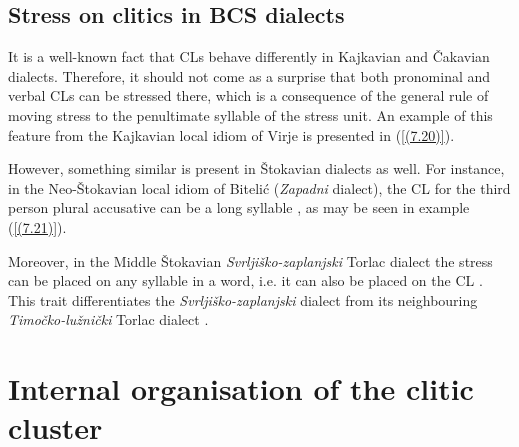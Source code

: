 \subsection{Stress on clitics in BCS dialects}

It is a well-known fact that CLs behave differently in Kajkavian and Čakavian dialects. Therefore, it should not come as a surprise that both pronominal and verbal CLs can be stressed there, which is a consequence of the general rule of moving stress to the penultimate syllable of the stress unit. An example of this feature from the Kajkavian local idiom of Virje is presented in (\ref{(7.20)}).


\noindent However, something similar is present in Štokavian dialects as well. For instance, in the Neo-Štokavian local idiom of Bitelić (\textit{Zapadni} dialect), the CL for the third person plural accusative can be a long syllable \citep[cf.][186]{Curkovic14}, as may be seen in example (\ref{(7.21)}). 


\noindent Moreover, in the Middle Štokavian \textit{Svrljiško-zaplanjski} Torlac dialect the stress can be placed on any syllable in a word, i.e. it can also be placed on the CL \citep[254]{Okuka08}. This trait differentiates the \textit{Svrljiško-zaplanjski} dialect from its neighbouring \textit{Timočko-lužnički} Torlac dialect \citep[cf.][257]{Okuka08}.

\section{Internal organisation of the clitic cluster}
\label{Internal organisation of the clitic cluster:8}
